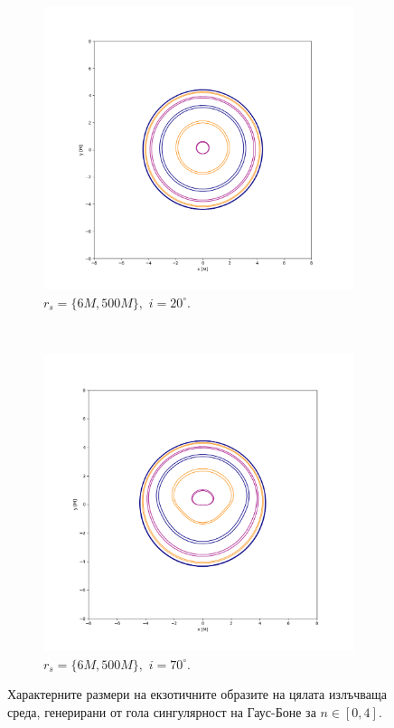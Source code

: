 \begin{figure}[!htb]
	\begin{subfigure}{6cm}
		\includegraphics[scale = 0.25]{GB_20_deg_r6_500_gamma_1.15.png}
		\caption{$r_s = \{6M, 500M\},\,\, i = 20^\circ$.}
	\end{subfigure}\,\,\,
	\begin{subfigure}{6cm}
		\includegraphics[scale = 0.25]{GB_70_deg_r6_500_gamma_1.15.png}
		\caption{$r_s = \{6M, 500M\},\,\, i = 70^\circ$.}
	\end{subfigure}
	\caption[Характерните размери на екзотичните образите на цялата излъчваща среда, генерирани от гола сингулярност на Гаус-Боне.]{\small Характерните размери на екзотичните образите на цялата излъчваща среда, генерирани от гола сингулярност на Гаус-Боне за $n\in[0, 4]$.} 
	\label{GB_img_size_deg}
\end{figure}

